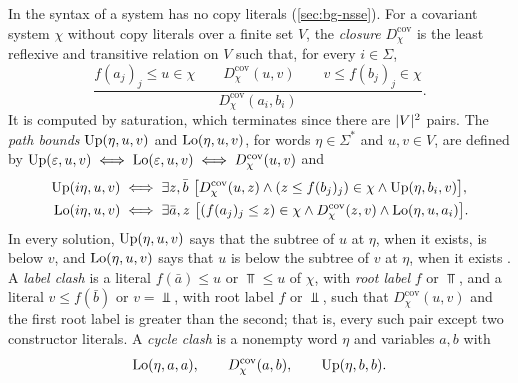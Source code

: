 In the syntax of \citet{Zhao26} a system has no copy literals
(\cref{sec:bg-nsse}). For a covariant system $\chi$ without copy literals over a
finite set $V$, the \emph{closure} $D^{\mathrm{cov}}_\chi$ is the least reflexive and
transitive relation on $V$ such that, for every $i\in\Sigma$,
\begin{equation}\label{eq:bg-decomp}
 \frac{f(a_j)_j\le u\in\chi\qquad D^{\mathrm{cov}}_\chi(u,v)\qquad v\le f(b_j)_j\in\chi}
      {D^{\mathrm{cov}}_\chi(a_i,b_i)} .
\end{equation}
It is computed by saturation, which terminates since there are $\lvert V\rvert^2$
pairs. The \emph{path bounds} $\mathrm{Up}(\eta,u,v)$ and
$\mathrm{Lo}(\eta,u,v)$, for words $\eta\in\Sigma^*$ and $u,v\in V$, are defined by
$\mathrm{Up}(\varepsilon,u,v)\iff\mathrm{Lo}(\varepsilon,u,v)\iff D^{\mathrm{cov}}_\chi(u,v)$ and
\begin{equation}\label{eq:bg-paths}
\begin{aligned}
 \Up(i\eta,u,v)&\iff\exists z,\bar b\ \bigl[D^{\mathrm{cov}}_\chi(u,z)\land
   (z\le f(b_j)_j)\in\chi\land\Up(\eta,b_i,v)\bigr],\\
 \Lo(i\eta,u,v)&\iff\exists\bar a,z\ \bigl[(f(a_j)_j\le z)\in\chi\land
   D^{\mathrm{cov}}_\chi(z,v)\land\Lo(\eta,u,a_i)\bigr].
\end{aligned}
\end{equation}
In every solution, $\mathrm{Up}(\eta,u,v)$ says that the subtree of $u$ at $\eta$, when
it exists, is below $v$, and $\mathrm{Lo}(\eta,u,v)$ says that $u$ is below the subtree
of $v$ at $\eta$, when it exists . A \emph{label clash} is a
literal $f(\bar a)\le u$ or $\Top\le u$ of $\chi$, with \emph{root label} $f$ or
$\Top$, and a literal $v\le f(\bar b)$ or $v=\Bot$, with root label $f$ or
$\Bot$, such that $D^{\mathrm{cov}}_\chi(u,v)$ and the first root label is greater than the
second; that is, every such pair except two constructor literals. A
\emph{cycle clash} is a nonempty word $\eta$ and variables $a,b$ with
\begin{equation}\label{eq:bg-cycle-clash}
 \mathrm{Lo}(\eta,a,a),\qquad D^{\mathrm{cov}}_\chi(a,b),\qquad \mathrm{Up}(\eta,b,b).
\end{equation}

